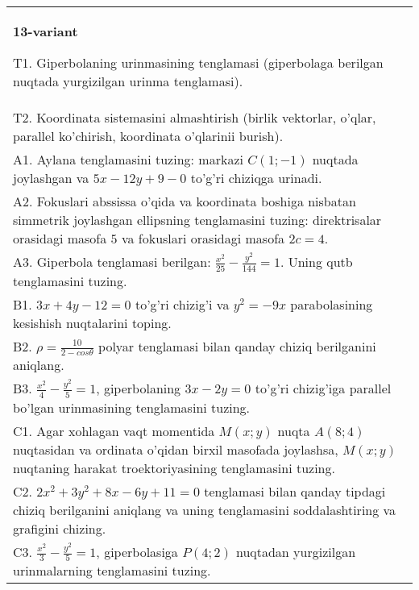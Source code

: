 \documentclass{article}
\begin{document}
\begin{tabular}{m{17cm}}
\textbf{13-variant}
\newline

T1. Giperbolaning urinmasining tenglamasi (giperbolaga berilgan nuqtada yurgizilgan urinma tenglamasi).\\

T2. Koordinata sistemasini almashtirish (birlik vektorlar, o'qlar, parallel ko'chirish, koordinata o'qlarinii burish).\\

A1. Aylana tenglamasini tuzing: markazi $C(1;-1)$ nuqtada joylashgan va $5x-12y+9-0$ to'g'ri chiziqga urinadi.\\

A2. Fokuslari abssissa o'qida va koordinata boshiga nisbatan simmetrik joylashgan ellipsning tenglamasini tuzing: direktrisalar orasidagi masofa $5$ va fokuslari orasidagi masofa $2c=4$.\\

A3. Giperbola tenglamasi berilgan: $\frac{x^{2}}{25}-\frac{y^{2}}{144}=1$. Uning qutb tenglamasini tuzing.\\

B1. $3x + 4y - 12 = 0$ to'g'ri chizig'i va $y^{2} = - 9x$ parabolasining kesishish nuqtalarini toping.\\

B2. $\rho = \frac{10}{2 - cos\theta}$ polyar tenglamasi bilan qanday chiziq berilganini aniqlang.  \\

B3. $\frac{x^{2}}{4} - \frac{y^{2}}{5} = 1$, giperbolaning $3x - 2y = 0$ to'g'ri chizig'iga parallel bo'lgan urinmasining tenglamasini tuzing.  \\

C1. Agar xohlagan vaqt momentida $M(x;y)$ nuqta $A(8;4)$ nuqtasidan va ordinata o'qidan birxil masofada joylashsa, $M(x;y)$ nuqtaning harakat troektoriyasining tenglamasini tuzing.  \\

C2. $2x^{2} + 3y^{2} + 8x - 6y + 11 = 0$ tenglamasi bilan qanday tipdagi chiziq berilganini aniqlang va uning tenglamasini soddalashtiring va grafigini chizing.  \\

C3. $\frac{x^{2}}{3} - \frac{y^{2}}{5} = 1$, giperbolasiga $P(4;2)$ nuqtadan yurgizilgan urinmalarning tenglamasini tuzing.  \\

\end{tabular}
\vspace{1cm}
\end{document}

